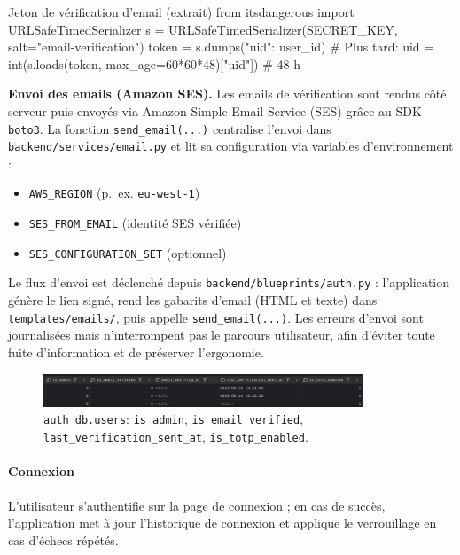 \begin{codebox}[language=Python]{Jeton de vérification d'email (extrait)}
from itsdangerous import URLSafeTimedSerializer
s = URLSafeTimedSerializer(SECRET_KEY, salt="email-verification")
token = s.dumps({"uid": user_id})
# Plus tard:  uid = int(s.loads(token, max_age=60*60*48)["uid"])  # 48 h
\end{codebox}

\noindent\textbf{Envoi des emails (Amazon SES).} Les emails de vérification sont rendus côté serveur puis envoyés via Amazon Simple Email Service (SES) grâce au SDK \texttt{boto3}. La fonction \texttt{send\_email(...)} centralise l'envoi dans \texttt{backend/services/email.py} et lit sa configuration via variables d'environnement :
\begin{itemize}
  \item \texttt{AWS\_REGION} (p.~ex. \texttt{eu-west-1})
  \item \texttt{SES\_FROM\_EMAIL} (identité SES vérifiée)
  \item \texttt{SES\_CONFIGURATION\_SET} (optionnel)
\end{itemize}
Le flux d'envoi est déclenché depuis \texttt{backend/blueprints/auth.py} : l'application génère le lien signé, rend les gabarits d'email (HTML et texte) dans \texttt{templates/emails/}, puis appelle \texttt{send\_email(...)}. Les erreurs d'envoi sont journalisées mais n'interrompent pas le parcours utilisateur, afin d'éviter toute fuite d'information et de préserver l'ergonomie.

\begin{figure}[H]
  \centering
  \includegraphics[width=0.85\textwidth]{../figures/chap10/auth_db2.png}
  \caption[users — champs statut]{\texttt{auth\_db.users}: \texttt{is\_admin}, \texttt{is\_email\_verified}, \texttt{last\_verification\_sent\_at}, \texttt{is\_totp\_enabled}.}
\end{figure}

\paragraph{Connexion}
L'utilisateur s'authentifie sur la page de connexion ; en cas de succès, l'application met à jour l'historique de connexion et applique le verrouillage en cas d'échecs répétés.

